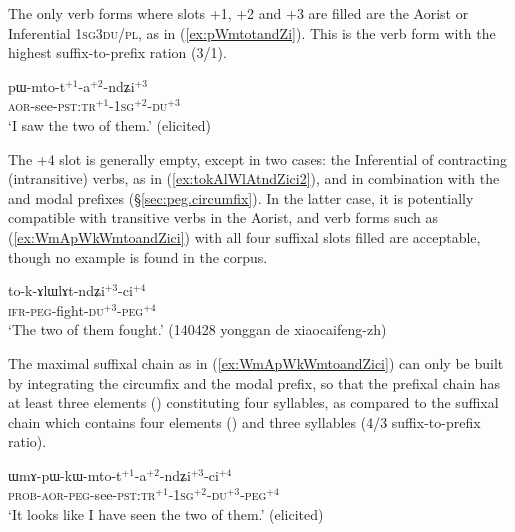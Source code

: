 The only verb forms where slots +1, +2 and +3 are filled are the Aorist or Inferential \textsc{1sg}\fl{}3\textsc{du/pl}, as in (\ref{ex:pWmtotandZi}). This is the verb form with the highest suffix-to-prefix ration (3/1).

\begin{exe}
\ex \label{ex:pWmtotandZi}
\gll pɯ-mto-t$^{+1}$-a$^{+2}$-ndʑi$^{+3}$\\
\textsc{aor}-see-\textsc{pst}:\textsc{tr}$^{+1}$-\textsc{1sg}$^{+2}$-\textsc{du}$^{+3}$ \\
\glt `I saw the two of them.' (elicited)
\end{exe}
 
The +4 slot is generally empty, except in two cases: the Inferential of contracting (intransitive) verbs, as in (\ref{ex:tokAlWlAtndZici2}), and  in combination with the  and  modal prefixes (§\ref{sec:peg.circumfix}). In the latter case, it is potentially compatible with transitive verbs in the Aorist, and verb forms such as (\ref{ex:WmApWkWmtoandZici}) with all four suffixal slots filled are acceptable, though no example is found in the corpus.

\begin{exe}
\ex \label{ex:tokAlWlAtndZici2}
\gll to-k-ɤlɯlɤt-ndʑi$^{+3}$-ci$^{+4}$ \\
\textsc{ifr}-\textsc{peg}-fight-\textsc{du}$^{+3}$-\textsc{peg}$^{+4}$ \\
\glt `The two of them fought.' (140428 yonggan de xiaocaifeng-zh) 	
\end{exe}
 
The maximal suffixal chain as in (\ref{ex:WmApWkWmtoandZici}) can only be built by integrating the circumfix   and the modal  prefix, so that the prefixal chain has at least three elements () constituting four syllables, as compared to the suffixal chain which contains  four elements () and three syllables (4/3 suffix-to-prefix ratio).
 
\begin{exe}
\ex \label{ex:WmApWkWmtoandZici}
\gll  ɯmɤ-pɯ-kɯ-mto-t$^{+1}$-a$^{+2}$-ndʑi$^{+3}$-ci$^{+4}$ \\
 \textsc{prob}-\textsc{aor}-\textsc{peg}-see-\textsc{pst}:\textsc{tr}$^{+1}$-\textsc{1sg}$^{+2}$-\textsc{du}$^{+3}$-\textsc{peg}$^{+4}$ \\
 \glt `It looks like I have seen the two of them.' (elicited)
\end{exe} 
 
